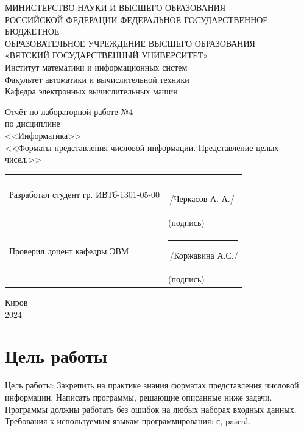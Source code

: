 \documentclass[oneside,a4paper,14pt]{extarticle}
\begin{document}
\newpage
\thispagestyle{empty}
\begin{center}
	МИНИСТЕРСТВО НАУКИ И ВЫСШЕГО ОБРАЗОВАНИЯ\\
	РОССИЙСКОЙ ФЕДЕРАЦИИ
	ФЕДЕРАЛЬНОЕ ГОСУДАРСТВЕННОЕ БЮДЖЕТНОЕ\\
	ОБРАЗОВАТЕЛЬНОЕ
	УЧРЕЖДЕНИЕ ВЫСШЕГО ОБРАЗОВАНИЯ\\
	«ВЯТСКИЙ ГОСУДАРСТВЕННЫЙ УНИВЕРСИТЕТ»\\
	Институт математики и информационных систем\\
	Факультет автоматики и вычислительной техники\\
	Кафедра электронных вычислительных машин
\end{center}
\vspace{20mm}

\begin{center}
	Отчёт по лабораторной работе №4\\
	по дисциплине\\
	<<Информатика>>\\
	<<Форматы представления числовой информации. Представление целых чисел.>>\\
\end{center}
\vspace{40mm}
\noindent
  \begin{tabular}{ll}
    Разработал студент гр. ИВТб-1301-05-00 & \rule[-1mm]{30mm}{0.10mm}\,/Черкасов А. А./\\
    & \hspace{8mm}\footnotesize(подпись)\\
     
    Проверил доцент кафедры ЭВМ & \rule[-1mm]{30mm}{0.10mm}\,/Коржавина А.С./\\
    & \hspace{8mm}\footnotesize(подпись)\\
  \end{tabular}

\vfill
\begin{center}
	Киров\\
	2024
\end{center}

\newpage\thispagestyle{plain}
\section*{Цель работы}
Цель работы: Закрепить на практике знания форматах представления числовой информации.
Написать программы, решающие описанные ниже задачи. Программы должны работать
без ошибок на любых наборах входных данных. Требования к используемым языкам
программирования: с, pascal.
\end{document}
